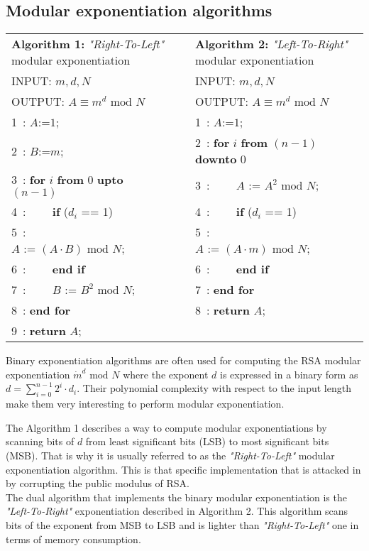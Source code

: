 \documentclass{article}
\begin{document}
\subsection{Modular exponentiation algorithms}
\begin{table}[ht]
\label{tab:l2r}
\begin{center}
\begin{tabular}{p{5.7cm}p{0.5cm}p{5.7cm}}
\cline{1-1} \cline{3-3}
\textbf{Algorithm 1:} \textit{"Right-To-Left"} modular exponentiation 
& &
\textbf{Algorithm 2:} \textit{"Left-To-Right"} modular exponentiation
\\
\cline{1-1} \cline{3-3} INPUT: $m, d, N$ & & INPUT: $m, d, N$ \\
OUTPUT: $A \equiv m^d \mbox{ mod }N$ & & OUTPUT: $A \equiv m^d \mbox{ mod }N$ \\
\cline{1-1} \cline{3-3} 1~: $A \mbox{:=} 1$; & & 1~: $A \mbox{:=} 1$;\\
2~: $B \mbox{:=} m$; & & 2~: \textbf{for} $i$ \textbf{from} $(n-1)$ \textbf{downto} $0$\\
3~: \textbf{for} $i$ \textbf{from} $0$ \textbf{upto} $(n-1)$ & & 3~: ~~~~$A \mbox{ := } A^{2}\mbox{ mod }N$;\\
4~: ~~~~\textbf{if} ($d_{i}$ == 1) & & 4~: ~~~~\textbf{if} ($d_{i}$ == 1)\\
5~: ~~~~~~~~$A \mbox{ := } (A \cdot B)\mbox{ mod }N$; & & 5~: ~~~~~~~~$A \mbox{ := } (A \cdot m)\mbox{ mod }N$;\\
6~: ~~~~\textbf{end if} & & 6~: ~~~~\textbf{end if}\\
7~: ~~~~$B \mbox{ := } B^{2}\mbox{ mod }N$; & & 7~: \textbf{end for}\\
8~: \textbf{end for} & & 8~: \textbf{return} $A$;\\
9~: \textbf{return} $A$;\\
\cline{1-1} \cline{3-3} 
\end{tabular}
\end{center}
\end{table}

Binary exponentiation algorithms are often used for computing the RSA modular exponentiation $\dot{m}^{d} \mbox{ mod } N$ where the exponent $d$ is expressed in a binary form as $d = \sum_{i=0}^{n-1} 2^{i} \cdot d_{i}$. Their polynomial complexity with respect to the input length make them very interesting to perform modular exponentiation.


The Algorithm 1 describes a way to compute modular exponentiations by
scanning bits of $d$ from least significant bits (LSB) to most
significant bits (MSB). That is why it is usually referred to as the \textit{"Right-To-Left"} modular exponentiation algorithm. This is that specific implementation that is attacked in \cite{77} by corrupting the public modulus of RSA.\\
\indent
The dual algorithm that implements the binary modular exponentiation is 
the \textit{"Left-To-Right"} exponentiation described in Algorithm 2. This algorithm scans bits of the exponent from MSB to LSB and is lighter than \textit{"Right-To-Left"} one in terms of memory consumption.
\end{document}
